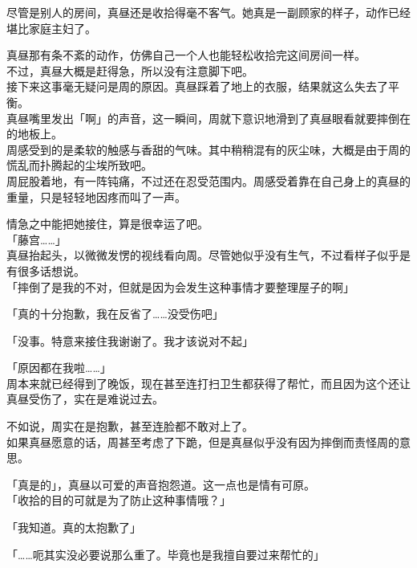 尽管是别人的房间，真昼还是收拾得毫不客气。她真是一副顾家的样子，动作已经堪比家庭主妇了。

真昼那有条不紊的动作，仿佛自己一个人也能轻松收拾完这间房间一样。\\

不过，真昼大概是赶得急，所以没有注意脚下吧。\\

接下来这事毫无疑问是周的原因。真昼踩着了地上的衣服，结果就这么失去了平衡。\\

真昼嘴里发出「啊」的声音，这一瞬间，周就下意识地滑到了真昼眼看就要摔倒在的地板上。\\

周感受到的是柔软的触感与香甜的气味。其中稍稍混有的灰尘味，大概是由于周的慌乱而扑腾起的尘埃所致吧。\\

周屁股着地，有一阵钝痛，不过还在忍受范围内。周感受着靠在自己身上的真昼的重量，只是轻轻地因疼而叫了一声。

情急之中能把她接住，算是很幸运了吧。\\

「藤宫……」\\

真昼抬起头，以微微发愣的视线看向周。尽管她似乎没有生气，不过看样子似乎是有很多话想说。\\

「摔倒了是我的不对，但就是因为会发生这种事情才要整理屋子的啊」

「真的十分抱歉，我在反省了……没受伤吧」

「没事。特意来接住我谢谢了。我才该说对不起」

「原因都在我啦……」\\

周本来就已经得到了晚饭，现在甚至连打扫卫生都获得了帮忙，而且因为这个还让真昼受伤了，实在是难说过去。

不如说，周实在是抱歉，甚至连脸都不敢对上了。\\

如果真昼愿意的话，周甚至考虑了下跪，但是真昼似乎没有因为摔倒而责怪周的意思。

「真是的」，真昼以可爱的声音抱怨道。这一点也是情有可原。\\

「收拾的目的可就是为了防止这种事情哦？」

「我知道。真的太抱歉了」

「……呃其实没必要说那么重了。毕竟也是我擅自要过来帮忙的」\\

